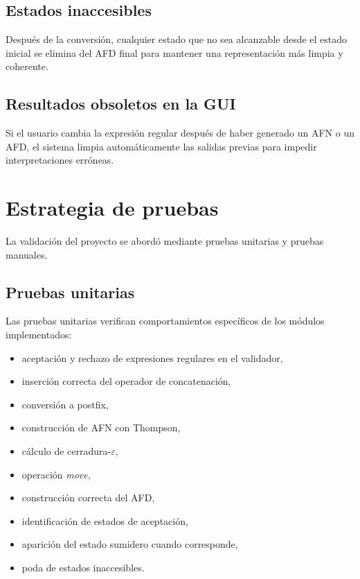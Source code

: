 \documentclass[12pt]{article}
\begin{document}
\subsection{Estados inaccesibles}

Después de la conversión, cualquier estado que no sea alcanzable desde el estado inicial se elimina del AFD final para mantener una representación más limpia y coherente.

\subsection{Resultados obsoletos en la GUI}

Si el usuario cambia la expresión regular después de haber generado un AFN o un AFD, el sistema limpia automáticamente las salidas previas para impedir interpretaciones erróneas.

\section{Estrategia de pruebas}

La validación del proyecto se abordó mediante pruebas unitarias y pruebas manuales.

\subsection{Pruebas unitarias}

Las pruebas unitarias verifican comportamientos específicos de los módulos implementados:
\begin{itemize}
    \item aceptación y rechazo de expresiones regulares en el validador,
    \item inserción correcta del operador de concatenación,
    \item conversión a postfix,
    \item construcción de AFN con Thompson,
    \item cálculo de cerradura-$\varepsilon$,
    \item operación \textit{move},
    \item construcción correcta del AFD,
    \item identificación de estados de aceptación,
    \item aparición del estado sumidero cuando corresponde,
    \item poda de estados inaccesibles.
\end{itemize}
\end{document}
